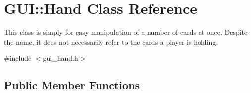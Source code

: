 \hypertarget{classGUI_1_1Hand}{\section{G\-U\-I\-:\-:Hand Class Reference}
\label{classGUI_1_1Hand}
}


This class is simply for easy manipulation of a number of cards at once. Despite the name, it does not necessarily refer to the cards a player is holding.  




{\ttfamily \#include $<$gui\-\_\-hand.\-h$>$}

\subsection*{Public Member Functions}
